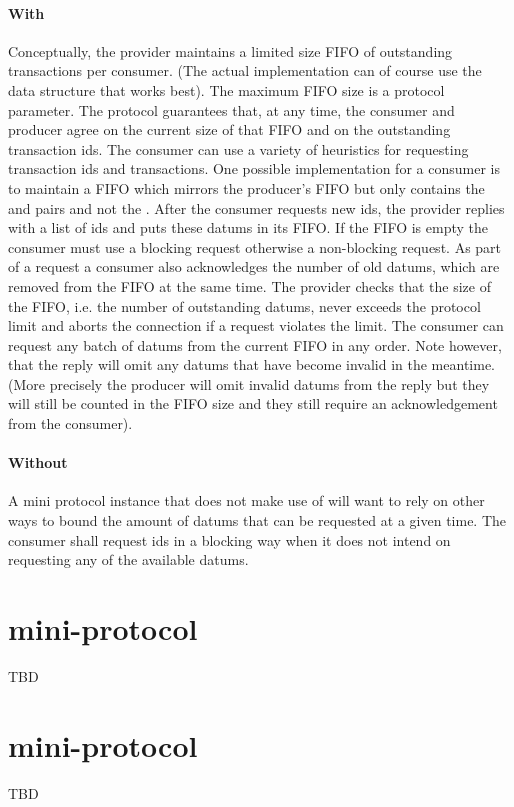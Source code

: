 \paragraph{With \BoundedWindow{}}
Conceptually, the provider maintains a limited size FIFO of outstanding transactions per consumer.
(The actual implementation can of course use the data structure that works best).
The maximum FIFO size is a protocol parameter.
The protocol guarantees that, at any time, the consumer and producer agree on the current size of
that FIFO and on the outstanding transaction ids.
The consumer can use a variety of heuristics for requesting transaction ids and transactions.
One possible implementation for a consumer is to maintain a FIFO which mirrors the producer's FIFO
but only contains the \id{} and \info{} pairs and not the \datum{}.
%
After the consumer requests new ids, the provider replies with a list of ids and
puts these datums in its FIFO. If the FIFO is empty the consumer must use a blocking
request otherwise a non-blocking request.
As part of a request a consumer also acknowledges the number of old datums,
which are removed from the FIFO at the same time.
The provider checks that the size of the FIFO, i.e. the number of outstanding datums,
never exceeds the protocol limit and aborts the connection if a request violates the limit.
The consumer can request any batch of datums from the current FIFO in any order.
Note however, that the reply will omit any datums that have become invalid in the meantime.
(More precisely the producer will omit invalid datums from the reply but they will still be counted in the FIFO
size and they still require an acknowledgement from the consumer).

\paragraph{Without \BoundedWindow{}} A \relay{} mini protocol instance that does not make use of \BoundedWindow{} will want to rely on other ways to bound the amount of datums that can be requested at a given time.
The consumer shall request ids in a blocking way when it does not
intend on requesting any of the available datums.


\section{\catchup{} mini-protocol}
\label{ptcl:catch-up}
TBD

\section{\fetch{} mini-protocol}
\label{ptcl:fetch}
TBD
